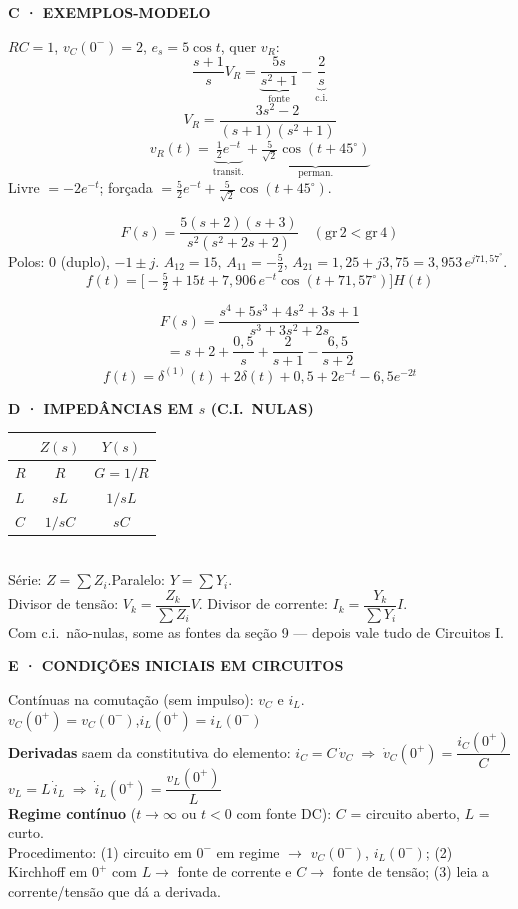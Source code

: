 \documentclass[10pt,a4paper]{article}
\renewcommand{\arraystretch}{1.05}
\newcommand{\sect}[1]{\vspace{1.2mm}{\color{acc}\rule{\linewidth}{0.9pt}}\vspace{-0.3mm}\par
  {\footnotesize\bfseries\color{acc}\MakeUppercase{#1}}\par\vspace{0.6mm}}
\newcommand{\sub}[1]{\vspace{0.8mm}{\bfseries #1}\par\vspace{0.3mm}}
\newcommand{\note}[1]{{\color{gry}#1}\par\vspace{0.4mm}}
\newcommand{\ci}{0^{-}}
\newcommand{\cip}{0^{+}}
\begin{document}
\begin{multicols}{3}
\sect{C · Exemplos-modelo}
\sub{C1 · RC com c.i. (mód.\ 02)}
$RC{=}1$, $v_C(\ci){=}2$, $e_s{=}5\cos t$, quer $v_R$:
\[\frac{s{+}1}{s}V_R=\underbrace{\frac{5s}{s^2{+}1}}_{\text{fonte}}-\underbrace{\frac{2}{s}}_{\text{c.i.}}\]
\[V_R=\frac{3s^2{-}2}{(s{+}1)(s^2{+}1)}\]
\[v_R(t)=\underbrace{\tfrac12e^{-t}}_{\text{transit.}}+\underbrace{\tfrac{5}{\sqrt2}\cos(t{+}45^\circ)}_{\text{perman.}}\]
Livre $=-2e^{-t}$;\; forçada $=\tfrac52e^{-t}+\tfrac{5}{\sqrt2}\cos(t{+}45^\circ)$.

\sub{C2 · Polo duplo + par conj.\ (mód.\ 03)}
\[F(s)=\frac{5(s{+}2)(s{+}3)}{s^2(s^2{+}2s{+}2)}\quad(\mathrm{gr}\,2<\mathrm{gr}\,4)\]
Polos: $0$ (duplo), $-1\pm j$. $A_{12}{=}15$, $A_{11}{=}-\tfrac52$, $A_{21}{=}1{,}25{+}j3{,}75=3{,}953\,e^{j71{,}57^\circ}$.
\[f(t)=\big[{-}\tfrac52+15t+7{,}906\,e^{-t}\cos(t{+}71{,}57^\circ)\big]H(t)\]

\sub{C3 · Imprópria $\to$ doublet (mód.\ 03)}
\[F(s)=\frac{s^4{+}5s^3{+}4s^2{+}3s{+}1}{s^3{+}3s^2{+}2s}\]
\[=s+2+\frac{0{,}5}{s}+\frac{2}{s{+}1}-\frac{6{,}5}{s{+}2}\]
\[f(t)=\delta^{(1)}(t)+2\delta(t)+0{,}5+2e^{-t}-6{,}5e^{-2t}\]


\sect{D · Impedâncias em $s$ (c.i.\ nulas)}
{\renewcommand{\arraystretch}{1.3}
\begin{tabular}{@{}l@{\quad}c@{\quad}c@{}}
 & $Z(s)$ & $Y(s)$\\
\hline
$R$ & $R$ & $G=1/R$\\
$L$ & $sL$ & $1/sL$\\
$C$ & $1/sC$ & $sC$\\
\end{tabular}}\\[1mm]
Série: $Z=\sum Z_i$.\quad Paralelo: $Y=\sum Y_i$.\\
Divisor de tensão: $V_k=\dfrac{Z_k}{\sum Z_i}V$.\quad
Divisor de corrente: $I_k=\dfrac{Y_k}{\sum Y_i}I$.\\[0.4mm]
\note{Com c.i.\ não-nulas, some as fontes da seção 9 — depois vale tudo de Circuitos I.}

\sect{E · Condições iniciais em circuitos}
Contínuas na comutação (sem impulso): $v_C$ e $i_L$.\\
$v_C(\cip)=v_C(\ci)$,\qquad $i_L(\cip)=i_L(\ci)$\\[0.6mm]
\textbf{Derivadas} saem da constitutiva do elemento:
$i_C=C\,\dot v_C\;\Rightarrow\;\dot v_C(\cip)=\dfrac{i_C(\cip)}{C}$\\[0.8mm]
$v_L=L\,\dot i_L\;\Rightarrow\;\dot i_L(\cip)=\dfrac{v_L(\cip)}{L}$\\[0.6mm]
\textbf{Regime contínuo} ($t\to\infty$ ou $t<0$ com fonte DC): $C$ = circuito aberto, $L$ = curto.\\[0.4mm]
Procedimento: (1) circuito em $\ci$ em regime $\to$ $v_C(\ci)$, $i_L(\ci)$; (2) Kirchhoff em $\cip$ com $L\to$ fonte de corrente e $C\to$ fonte de tensão; (3) leia a corrente/tensão que dá a derivada.


\end{multicols}
\end{document}
